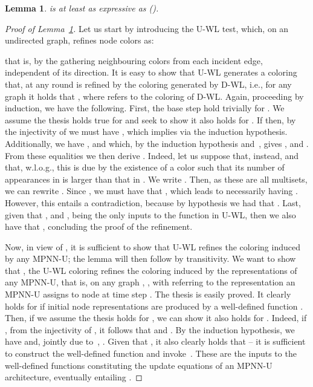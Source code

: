 \documentclass{article}
\theoremstyle{plain}
\newtheorem{lemma}[theorem]{Lemma}
\theoremstyle{definition}
\theoremstyle{remark}
\begin{document}
\begin{lemma}\label{lemma:dirgnn-at-least-as-expressive-as-mpnn-u}
     is at least as expressive as  (). 
\end{lemma}

\begin{proof}[Proof of Lemma~\ref{lemma:dirgnn-at-least-as-expressive-as-mpnn-u}]
    Let us start by introducing the U-WL test, which, on an undirected graph, refines node colors as:
    
    that is, by the gathering neighbouring colors from each incident edge, independent of its direction. It is easy to show that U-WL generates a coloring that, at any round  is refined by the coloring generated by D-WL, i.e., for any graph  it holds that , where  refers to the coloring of D-WL. Again, proceeding by induction, we have the following. First, the base step hold trivially for . We assume the thesis holds true for  and seek to show it also holds for . If  then, by the injectivity of  we must have , which implies  via the induction hypothesis. Additionally, we have , and  which, by the induction hypothesis and~\citep[Lemma 2]{bevilacqua2022equivariant}, gives , and . From these equalities we then derive . Indeed, let us suppose that, instead,  and that, w.l.o.g., this is due by the existence of a color  such that its number of appearances in  is larger than that in . We write . Then, as these are all multisets, we can rewrite . Since , we must have that , which leads to necessarily having . However, this entails a contradiction, because by hypothesis we had that . Last, given that , and , being the only inputs to the  function in U-WL, then we also have that , concluding the proof of the refinement.

    Now, in view of , it is sufficient to show that U-WL refines the coloring induced by any MPNN-U; the lemma will then follow by transitivity. We want to show that , the U-WL coloring  refines the coloring induced by the representations of any MPNN-U, that is, on any graph , , with  referring to the representation an MPNN-U assigns to node  at time step . The thesis is easily proved. It clearly holds for  if initial node representations are produced by a well-defined function . Then, if we assume the thesis holds for , we can show it also holds for . Indeed, if , from the injectivity of , it follows that  and . By the induction hypothesis, we have  and, jointly due to~\citep[Lemma 2]{bevilacqua2022equivariant}, . Given that , it also clearly holds that  -- it is sufficient to construct the well-defined function  and invoke~\citep[Lemma 3]{bevilacqua2022equivariant}. These are the inputs to the well-defined functions constituting the update equations of an MPNN-U architecture, eventually entailing .
\end{proof}
\end{document}
